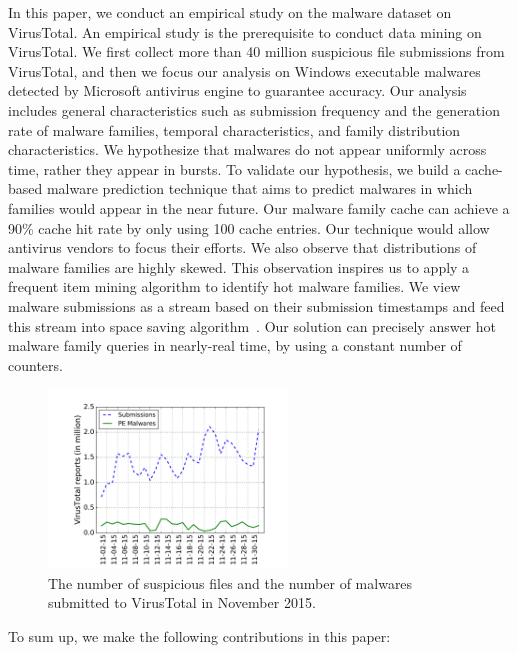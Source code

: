 In this paper, we conduct an empirical study on the malware dataset on VirusTotal. 
An empirical study is the prerequisite to conduct data mining on VirusTotal. 
We first collect more than 40 million suspicious file submissions from VirusTotal, and then 
we focus our analysis on Windows executable malwares detected by Microsoft
antivirus engine to guarantee accuracy. 
Our analysis includes general characteristics such as submission frequency and the generation rate of malware families, 
temporal characteristics, and family distribution characteristics. 
We hypothesize that malwares do not appear uniformly across time, rather they appear in bursts. 
To validate our hypothesis, we build a cache-based malware prediction technique that aims to predict malwares in which families would appear in the near future. 
Our malware family cache can achieve a 90\% cache hit rate by only using 100 cache entries.
Our technique would allow antivirus vendors to focus their efforts. 
We also observe that distributions of malware families are highly skewed. 
This observation inspires us to apply a frequent item mining algorithm to 
identify hot malware families. 
We view malware submissions as a stream based on their submission timestamps and 
feed this stream into space saving algorithm~\cite{space-saving}. 
Our solution can precisely answer hot malware family queries in nearly-real time, by using a constant number of counters.  


\begin{figure}[t!]
\begin{center}
\includegraphics[width=2.5in]{figure/nov}
\caption{The number of suspicious files and the number of malwares submitted to VirusTotal in November 2015. }
\label{fig:subnum}
\end{center}
\end{figure}

To sum up, we make the following contributions in this paper:


